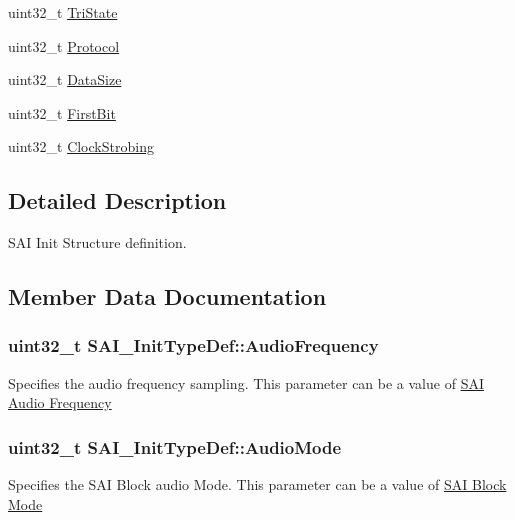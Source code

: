 \begin{DoxyCompactItemize}
uint32\+\_\+t \hyperlink{struct_s_a_i___init_type_def_ab1a1d8d86c50495b69287a79f8217098}{Tri\+State}
\item 
uint32\+\_\+t \hyperlink{struct_s_a_i___init_type_def_a0cafd999f80015e472bff2812642746c}{Protocol}
\item 
uint32\+\_\+t \hyperlink{struct_s_a_i___init_type_def_a74372832a9b609290a1b476533686564}{Data\+Size}
\item 
uint32\+\_\+t \hyperlink{struct_s_a_i___init_type_def_a7683663e2a24126a30d15f1905b2b0ad}{First\+Bit}
\item 
uint32\+\_\+t \hyperlink{struct_s_a_i___init_type_def_a2d835ab2f64a7b8724e1f66db1a328a2}{Clock\+Strobing}
\end{DoxyCompactItemize}


\subsection{Detailed Description}
S\+AI Init Structure definition. 

\subsection{Member Data Documentation}
\subsubsection[{\texorpdfstring{Audio\+Frequency}{AudioFrequency}}]{\setlength{\rightskip}{0pt plus 5cm}uint32\+\_\+t S\+A\+I\+\_\+\+Init\+Type\+Def\+::\+Audio\+Frequency}\hypertarget{struct_s_a_i___init_type_def_a7c9c20beda843b37400a59ade67875b3}{}\label{struct_s_a_i___init_type_def_a7c9c20beda843b37400a59ade67875b3}
Specifies the audio frequency sampling. This parameter can be a value of \hyperlink{group___s_a_i___audio___frequency}{S\+AI Audio Frequency} 
\subsubsection[{\texorpdfstring{Audio\+Mode}{AudioMode}}]{\setlength{\rightskip}{0pt plus 5cm}uint32\+\_\+t S\+A\+I\+\_\+\+Init\+Type\+Def\+::\+Audio\+Mode}\hypertarget{struct_s_a_i___init_type_def_a92d4cfb6eef4b7102e77def3ed8453d6}{}\label{struct_s_a_i___init_type_def_a92d4cfb6eef4b7102e77def3ed8453d6}
Specifies the S\+AI Block audio Mode. This parameter can be a value of \hyperlink{group___s_a_i___block___mode}{S\+AI Block Mode} 
